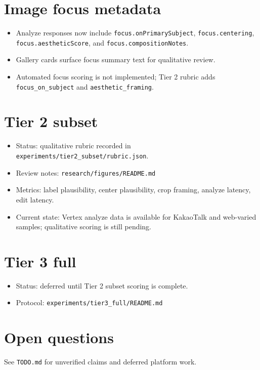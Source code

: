 \documentclass{article}
\begin{document}
\section{Image focus metadata}
\begin{itemize}
  \item Analyze responses now include \texttt{focus.onPrimarySubject}, \texttt{focus.centering}, \texttt{focus.aestheticScore}, and \texttt{focus.compositionNotes}.
  \item Gallery cards surface focus summary text for qualitative review.
  \item Automated focus scoring is not implemented; Tier 2 rubric adds \texttt{focus\_on\_subject} and \texttt{aesthetic\_framing}.
\end{itemize}

\section{Tier 2 subset}
\begin{itemize}
  \item Status: qualitative rubric recorded in \texttt{experiments/tier2\_subset/rubric.json}.
  \item Review notes: \texttt{research/figures/README.md}
  \item Metrics: label plausibility, center plausibility, crop framing, analyze latency, edit latency.
  \item Current state: Vertex analyze data is available for KakaoTalk and web-varied samples; qualitative scoring is still pending.
\end{itemize}

\section{Tier 3 full}
\begin{itemize}
  \item Status: deferred until Tier 2 subset scoring is complete.
  \item Protocol: \texttt{experiments/tier3\_full/README.md}
\end{itemize}

\section{Open questions}
See \texttt{TODO.md} for unverified claims and deferred platform work.
\end{document}
